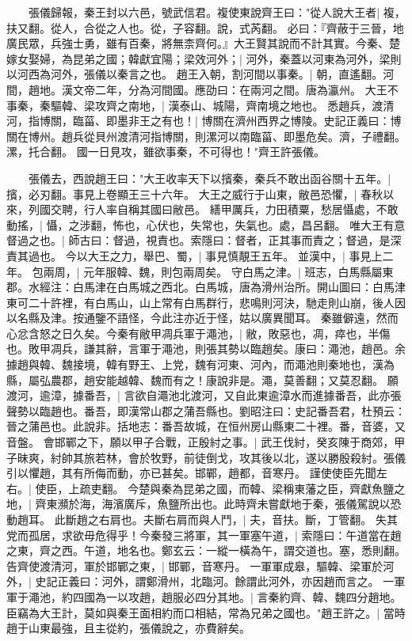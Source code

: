 　　張儀歸報，秦王封以六邑，號武信君。複使東說齊王曰："從人說大王者|{
	複，扶又翻。從人，合從之人也。從，子容翻。說，式芮翻。
	}
必曰：『齊蔽于三晉，地廣民眾，兵強士勇，雖有百秦，將無柰齊何。』大王賢其說而不計其實。今秦、楚嫁女娶婦，為昆弟之國；韓獻宜陽；梁效河外；|{
	河外，秦蓋以河東為河外，梁則以河西為河外，張儀以秦言之也。
	}
趙王入朝，割河間以事秦。|{
	朝，直遙翻。河間，趙地。漢文帝二年，分為河間國。應劭曰：在兩河之間。唐為瀛州。
	}
大王不事秦，秦驅韓、梁攻齊之南地，|{
	漢泰山、城陽，齊南境之地也。
	}
悉趙兵，渡清河，指博關，臨菑、即墨非王之有也！|{
	博關在濟州西界之博陵。史記正義曰：博關在博州。趙兵從貝州渡清河指博關，則漯河以南臨菑、即墨危矣。濟，子禮翻。漯，托合翻。
	}
國一日見攻，雖欲事秦，不可得也！"齊王許張儀。

　　張儀去，西說趙王曰："大王收率天下以擯秦，秦兵不敢出函谷關十五年。|{
	擯，必刃翻。事見上卷顯王三十六年。
	}
大王之威行于山東，敝邑恐懼，|{
	春秋以來，列國交聘，行人率自稱其國曰敝邑。
	}
繕甲厲兵，力田積粟，愁居懾處，不敢動搖，|{
	懾，之涉翻，怖也，心伏也，失常也，失氣也。處，昌呂翻。
	}
唯大王有意督過之也。|{
	師古曰：督過，視責也。索隱曰：督者，正其事而責之；督過，是深責其過也。
	}
今以大王之力，舉巴、蜀，|{
	事見慎靚王五年。
	}
並漢中，|{
	事見上二年。
	}
包兩周，|{
	元年服韓、魏，則包兩周矣。
	}
守白馬之津。|{
	班志，白馬縣屬東郡。水經注：白馬津在白馬城之西北。白馬城，唐為滑州治所。開山圖曰：白馬津東可二十許裡，有白馬山，山上常有白馬群行，悲鳴則河決，馳走則山崩，後人因以名縣及津。按通鑒不語怪，今此注亦近于怪，姑以廣異聞耳。
	}
秦雖僻遠，然而心忿含怒之日久矣。今秦有敝甲凋兵軍于澠池，|{
	敝，敗惡也，凋，瘁也，半傷也。敗甲凋兵，謙其辭，言軍于澠池，則張其勢以臨趙矣。康曰：澠池，趙邑。余據趙與韓、魏接境，韓有野王、上党，魏有河東、河內，而澠池則秦地也，漢為縣，屬弘農郡，趙安能越韓、魏而有之！康說非是。澠，莫善翻；又莫忍翻。
	}
願渡河，逾漳，據番吾，|{
	言欲自澠池北渡河，又自此東逾漳水而進據番吾，此亦張聲勢以臨趙也。番吾，即漢常山郡之蒲吾縣也。劉昭注曰：史記番吾君，杜預云：晉之蒲邑也。此說非。括地志：番吾故城，在恒州房山縣東二十裡。番，音婆，又音盤。
	}
會邯鄲之下，願以甲子合戰，正殷紂之事。|{
	武王伐紂，癸亥陳于商郊，甲子昧爽，紂帥其旅若林，會於牧野，前徒倒戈，攻其後以北，遂以勝殷殺紂。張儀引以懼趙，其有所侮而動，亦已甚矣。邯鄲，趙都，音寒丹。
	}
謹使使臣先聞左右。|{
	使臣，上疏吏翻。
	}
今楚與秦為昆弟之國，而韓、梁稱東藩之臣，齊獻魚鹽之地，|{
	齊東瀕於海，海濱廣斥，魚鹽所出也。此時齊未嘗獻地于秦，張儀駕說以恐動趙耳。
	}
此斷趙之右肩也。夫斷右肩而與人鬥，|{
	夫，音扶。斷，丁管翻。
	}
失其党而孤居，求欲毋危得乎！今秦發三將軍，其一軍塞午道，|{
	索隱曰：午道當在趙之東，齊之西。午道，地名也。鄭玄云：一縱一橫為午，謂交道也。塞，悉則翻。
	}
告齊使渡清河，軍於邯鄲之東，|{
	邯鄲，音寒丹。
	}
一軍軍成皋，驅韓、梁軍於河外，|{
	史記正義曰：河外，謂鄭滑州，北臨河。餘謂此河外，亦因趙而言之。
	}
一軍軍于澠池，約四國為一以攻趙，趙服必四分其地。|{
	言秦約齊、韓、魏四分趙地。
	}
臣竊為大王計，莫如與秦王面相約而口相結，常為兄弟之國也。"趙王許之。|{
	當時趙于山東最強，且主從約，張儀說之，亦費辭矣。
	}

